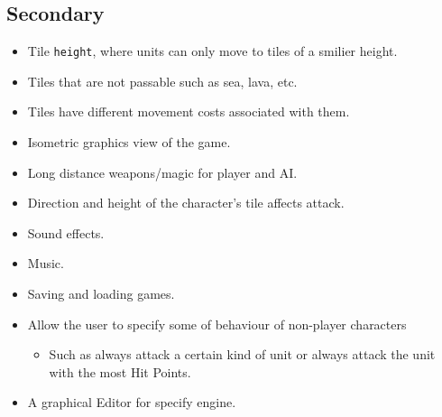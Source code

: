 \subsection{Secondary} \label{secondary}
\begin{itemize}
	\item Tile \texttt{height}, where units can only move to tiles of a smilier height.
	
	\item Tiles that are not passable such as sea, lava, etc.
	
	\item Tiles have different movement costs associated with them.
	
	\item Isometric graphics view of the game.
	
	\item Long distance weapons\slash magic for player and AI.
	
	\item Direction and height of the character's tile affects attack.
	
	\item Sound effects.
	
	\item Music.
	
	\item Saving and loading games.
	
	\item Allow the user to specify some of behaviour of non-player characters
	\begin{itemize}
		\item Such as always attack a certain kind of unit or always attack the unit with the most Hit Points.
	\end{itemize}
	
	\item A graphical Editor for specify engine.
\end{itemize}

